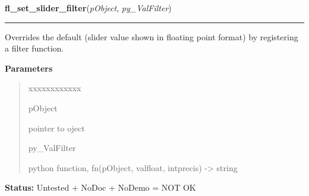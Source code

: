 \hspace{.8\funcindent}\begin{boxedminipage}{\funcwidth}

    \raggedright \textbf{fl\_set\_slider\_filter}(\textit{pObject}, \textit{py\_ValFilter})

    \vspace{-1.5ex}

    \rule{\textwidth}{0.5\fboxrule}
\setlength{\parskip}{2ex}
    Overrides the default (slider value shown in floating point format) by 
    registering a filter function.

\setlength{\parskip}{1ex}
      \textbf{Parameters}
      \vspace{-1ex}

      \begin{quote}
        \begin{Ventry}{xxxxxxxxxxxx}

          \item[pObject]

          pointer to oject

          \item[py\_ValFilter]

          python function, fn(pObject, valfloat, intprecis) -{\textgreater}
          string

        \end{Ventry}

      \end{quote}

\textbf{Status:} Untested + NoDoc + NoDemo = NOT OK



    \end{boxedminipage}

    \label{xformslib:library:fl_add_spinner}

    \vspace{0.5ex}

